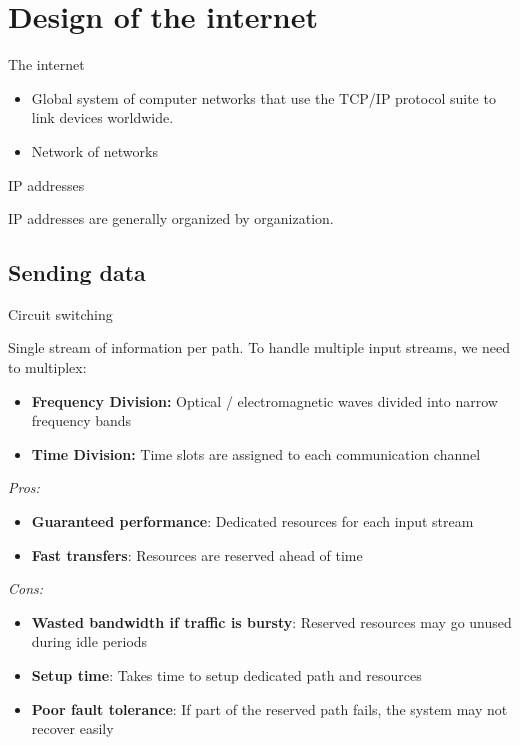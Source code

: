 
\section{Design of the internet}

\begin{definition}
    {The internet}

    \begin{itemize}
        \item Global system of computer networks that use the TCP/IP protocol suite to link devices worldwide.
        \item Network of networks
    \end{itemize}
\end{definition}

\begin{knBox}
    {IP addresses}

    IP addresses are generally organized by organization.
\end{knBox}

\subsection{Sending data}

\begin{definition}
    {Circuit switching}

    Single stream of information per path. To handle multiple input streams, we need to multiplex:

    \begin{itemize}
        \item \textbf{Frequency Division: } Optical / electromagnetic waves divided into narrow frequency bands
        \item \textbf{Time Division: } Time slots are assigned to each communication channel
    \end{itemize}

    \textit{Pros:}
    \begin{itemize}
        \item \textbf{Guaranteed performance}: Dedicated resources for each input stream
        \item \textbf{Fast transfers}: Resources are reserved ahead of time
    \end{itemize}
    \textit{Cons:}
    \begin{itemize}
        \item \textbf{Wasted bandwidth if traffic is bursty}: Reserved resources may go unused during idle periods
        \item \textbf{Setup time}: Takes time to setup dedicated path and resources
        \item \textbf{Poor fault tolerance}: If part of the reserved path fails, the system may not recover easily
    \end{itemize}
\end{definition}

